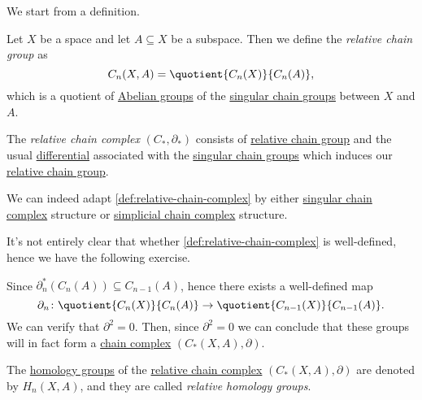 We start from a definition.
\begin{definition}\label{def:relative-chain-group}
	Let \(X\) be a space and let \(A \subseteq X\) be a subspace. Then we define the \emph{relative chain group} as
	\[
		C_n(X, A) = \quotient{C_n(X)}{C_n(A)},
	\]
	which is a quotient of \hyperref[def:Abelian-group]{Abelian groups} of the \hyperref[def:singular-chain-group]{singular chain groups}
	between \(X\) and \(A\).
\end{definition}
\begin{definition}\label{def:relative-chain-complex}
	The \emph{relative chain complex} \((C_\ast, \partial_\ast )\) consists of \hyperref[def:relative-chain-group]{relative chain group}
	and the usual \hyperref[def:differential]{differential} associated with the \hyperref[def:singular-chain-group]{singular chain groups} which
	induces our \hyperref[def:relative-chain-group]{relative chain group}.
\end{definition}
\begin{remark}
	We can indeed adapt \autoref{def:relative-chain-complex} by either \hyperref[def:singular-chain-complex]{singular chain complex}
	structure or \hyperref[def:simplicial-complex]{simplicial chain complex} structure.
\end{remark}

It's not entirely clear that whether \autoref{def:relative-chain-complex} is well-defined, hence we have the following exercise.
\begin{exercise}
	Since \(\partial^\ast_n(C_{n} (A))\subseteq C_{n-1}(A) \), hence there exists a well-defined map
	\[
		\partial_n\colon \quotient{C_{n} (X)}{C_{n} (A)} \to \quotient{C_{n-1} (X)}{C_{n-1}(A)}.
	\]
	We can verify that \(\partial^{2} =0\). Then, since \(\partial^2 = 0\) we can conclude that these groups will in fact form a
	\hyperref[def:chain-complex]{chain complex} \((C_\ast(X, A), \partial)\).
\end{exercise}

\begin{definition}\label{def:relative-homology-group}
	The \hyperref[def:homology-group]{homology groups} of the \hyperref[def:relative-chain-complex]{relative chain complex} \((C_\ast(X, A), \partial)\) are denoted
	by \(H_n(X, A)\), and they are called \emph{relative homology groups}.
\end{definition}

